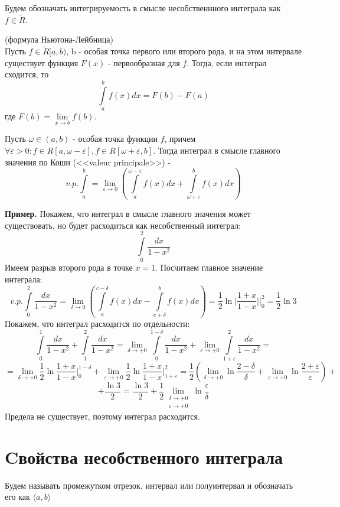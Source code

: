 Будем обозначать интегрируемость в смысле несобственнного интеграла как
$f\in \tilde R$.
\begin{theor}
    (формула Ньютона-Лейбница)\\
    Пусть $f\in \tilde R[a,b)$, b - особая точка первого или второго рода, 
    и на этом интервале существует функция $F(x)$ - первообразная для  $f$. 
    Тогда, если интеграл сходится, то
     $$\int\limits_{a}^{b}f(x)dx=F(b)-F(a)$$ 
     где $F(b)=\lim\limits_{x \to b}f(b)$.
\end{theor}
\begin{defin}
Пусть $\omega \in (a,b)$ - особая точка функции $f$, причем
$\forall \varepsilon>0:f\in R[a,\omega-\varepsilon],f\in R[\omega+\varepsilon,
b]$. Тогда интеграл в смысле главного значения по Коши 
(<<valeur principale>>) - 
$$v.p. \int\limits_{a}^{b}=\lim\limits_{\varepsilon \to 0}\left(
\int\limits_{a}^{\omega-\varepsilon}f(x)dx+\int\limits_{\omega+\varepsilon}^{b}
f(x)dx\right)$$
\end{defin}
\textbf{Пример.} Покажем, что интеграл в смысле главного значения может 
существовать, но будет расходиться как несобственный интеграл:
$$\int\limits_{0}^{2} \frac{dx}{1-x^2}$$ 
Имеем разрыв второго рода в точке $x=1$. Посчитаем главное значение интеграла:
$$v.p.\int\limits_{0}^{2} \frac{dx}{1-x^2}=
\lim\limits_{\delta \to 0} \left( \int\limits_{a}^{c-\delta}f(x)dx -
\int\limits_{c+\delta}^{b}f(x)dx\right) = \frac{1}{2}\ln\bigg|
\frac{1+x}{1-x}\bigg|\Big|^2_0 = \frac{1}{2}\ln3
$$
Покажем, что интеграл расходится по отдельности:
$$\int\limits_{0}^{1}\frac{dx}{1-x^2}+\int\limits_{1}^{2}\frac{dx}{1-x^2}=
\lim\limits_{\delta \to +0} \int\limits_{0}^{1-\delta}\frac{dx}{1-x^2}+
\lim\limits_{\varepsilon\to +0} 
\int\limits_{1+\varepsilon}^{2}\frac{dx}{1-x^2}=
$$
$$=\lim\limits_{\delta \to +0}\frac{1}{2}\ln \frac{1+x}{1-x}\Big|^{1-\delta}_0
+\lim\limits_{\varepsilon \to +0}\frac{1}{2}\ln \frac{1+x}{1-x}
\Big|^2_{1+\varepsilon}=
\frac{1}{2}\left( \lim\limits_{\delta \to +0}\ln \frac{2-\delta}{\delta}+
\lim\limits_{\varepsilon \to +0}\ln \frac{2+\varepsilon}{\varepsilon}
\right)+
$$
$$+\frac{\ln3}{2}=\frac{\ln3}{2}+\frac{1}{2}
\lim\limits_{\substack{\delta \to+0\\
\varepsilon \to +0}} \ln\frac{\varepsilon}{\delta}$$
Предела не существует, поэтому интеграл расходится.

\section{Cвойства несобственного интеграла}
Будем называть промежутком отрезок, интервал или полуинтервал и обозначать
его как $\langle a, b\rangle$

